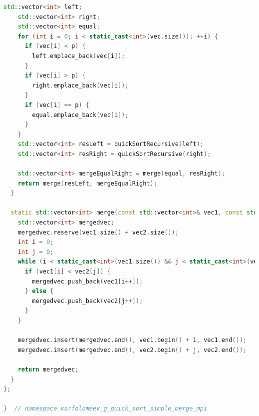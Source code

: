 \documentclass[a4paper,12pt]{article}
\begin{document}
\begin{lstlisting}[language=C++]
    std::vector<int> left;
    std::vector<int> right;
    std::vector<int> equal;
    for (int i = 0; i < static_cast<int>(vec.size()); ++i) {
      if (vec[i] < p) {
        left.emplace_back(vec[i]);
      }
      if (vec[i] > p) {
        right.emplace_back(vec[i]);
      }
      if (vec[i] == p) {
        equal.emplace_back(vec[i]);
      }
    }
    std::vector<int> resLeft = quickSortRecursive(left);
    std::vector<int> resRight = quickSortRecursive(right);

    std::vector<int> mergeEqualRight = merge(equal, resRight);
    return merge(resLeft, mergeEqualRight);
  }

  static std::vector<int> merge(const std::vector<int>& vec1, const std::vector<int>& vec2) {
    std::vector<int> mergedvec;
    mergedvec.reserve(vec1.size() + vec2.size());
    int i = 0;
    int j = 0;
    while (i < static_cast<int>(vec1.size()) && j < static_cast<int>(vec2.size())) {
      if (vec1[i] < vec2[j]) {
        mergedvec.push_back(vec1[i++]);
      } else {
        mergedvec.push_back(vec2[j++]);
      }
    }

    mergedvec.insert(mergedvec.end(), vec1.begin() + i, vec1.end());
    mergedvec.insert(mergedvec.end(), vec2.begin() + j, vec2.end());

    return mergedvec;
  }
};

}  // namespace varfolomeev_g_quick_sort_simple_merge_mpi

\end{lstlisting}
\end{document}
